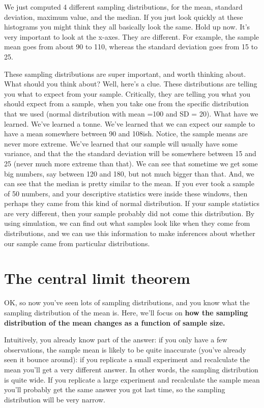 \documentclass[]{book}
\begin{document}
We just computed 4 different sampling distributions, for the mean, standard deviation, maximum value, and the median. If you just look quickly at these histograms you might think they all basically look the same. Hold up now. It's very important to look at the x-axes. They are different. For example, the sample mean goes from about 90 to 110, whereas the standard deviation goes from 15 to 25.

These sampling distributions are super important, and worth thinking about. What should you think about? Well, here's a clue. These distributions are telling you what to expect from your sample. Critically, they are telling you what you should expect from a sample, when you take one from the specific distribution that we used (normal distribution with mean =100 and SD = 20). What have we learned. We've learned a tonne. We've learned that we can expect our sample to have a mean somewhere between 90 and 108ish. Notice, the sample means are never more extreme. We've learned that our sample will usually have some variance, and that the the standard deviation will be somewhere between 15 and 25 (never much more extreme than that). We can see that sometime we get some big numbers, say between 120 and 180, but not much bigger than that. And, we can see that the median is pretty similar to the mean. If you ever took a sample of 50 numbers, and your descriptive statistics were inside these windows, then perhaps they came from this kind of normal distribution. If your sample statistics are very different, then your sample probably did not come this distribution. By using simulation, we can find out what samples look like when they come from distributions, and we can use this information to make inferences about whether our sample came from particular distributions.

\hypertarget{the-central-limit-theorem}{%
\section{The central limit theorem}\label{the-central-limit-theorem}}

OK, so now you've seen lots of sampling distributions, and you know what the sampling distribution of the mean is. Here, we'll focus on \textbf{how the sampling distribution of the mean changes as a function of sample size.}

Intuitively, you already know part of the answer: if you only have a few observations, the sample mean is likely to be quite inaccurate (you've already seen it bounce around): if you replicate a small experiment and recalculate the mean you'll get a very different answer. In other words, the sampling distribution is quite wide. If you replicate a large experiment and recalculate the sample mean you'll probably get the same answer you got last time, so the sampling distribution will be very narrow.
\end{document}
